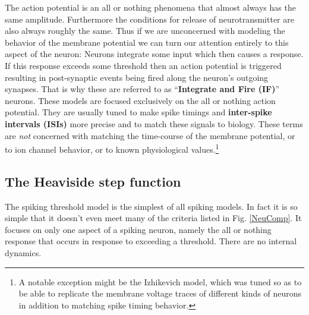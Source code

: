 The action potential is an all or nothing phenomena that almost always has the same amplitude. Furthermore the conditions for release of neurotransmitter are also always roughly the same. Thus if we are unconcerned with modeling the behavior of the membrane potential we can turn our attention entirely to this aspect of the neuron: Neurons integrate some input which then causes a response. If this response exceeds some threshold then an action potential is triggered resulting in post-synaptic events being fired along the neuron's outgoing synapses. That is why these are referred to as ``\textbf{Integrate and Fire (IF)}'' neurons. These models are focused exclusively on the all or nothing action potential. They are usually tuned to make spike timings and \textbf{inter-spike intervals (ISIs)} more precise and to match these signals to biology. These terms are \emph{not} concerned with matching the time-course of the membrane potential, or to ion channel behavior, or to known physiological values.\footnote{A notable exception might be the Izhikevich model, which was tuned so as to be able to replicate the membrane voltage traces of different kinds of neurons in addition to matching spike timing behavior.}


\subsection{The Heaviside step function}

The spiking threshold model is the simplest of all spiking models. In fact it is so simple that it doesn't even meet many of the criteria listed in Fig. \ref{NeuComp}. It focuses on only one aspect of a spiking neuron, namely the all or nothing response that occurs in response to exceeding a threshold. There are no internal dynamics.

